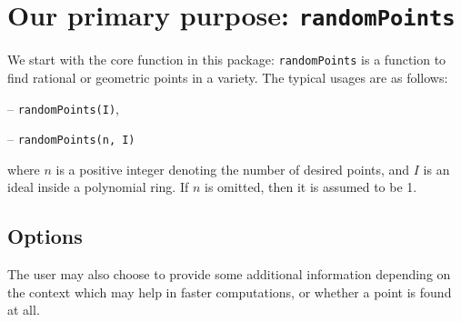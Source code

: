 \documentclass[11pt]{amsart}
\theoremstyle{definition}
\begin{document}
\section{Our primary purpose: {\tt randomPoints}}\label{randomPoints}
    We start with the core function in this package:  {\tt randomPoints} is a function to find rational or geometric points in a variety. The typical usages are as follows: 

    \vspace{0.5em}
    -- {\tt randomPoints(I)}, 

    -- {\tt randomPoints(n, I)} 

    \vspace{0.5em}
    \noindent where $n$ is a positive integer denoting the number of desired points, and 
    $I$ is an ideal inside a polynomial ring.  If {$ n$} is omitted, then it is assumed to be 1.


    \subsection{Options}\label{strategydetails}

    The user may also choose to provide some additional information depending on the context which may help in faster computations, or whether a point is found at all.
\end{document}
